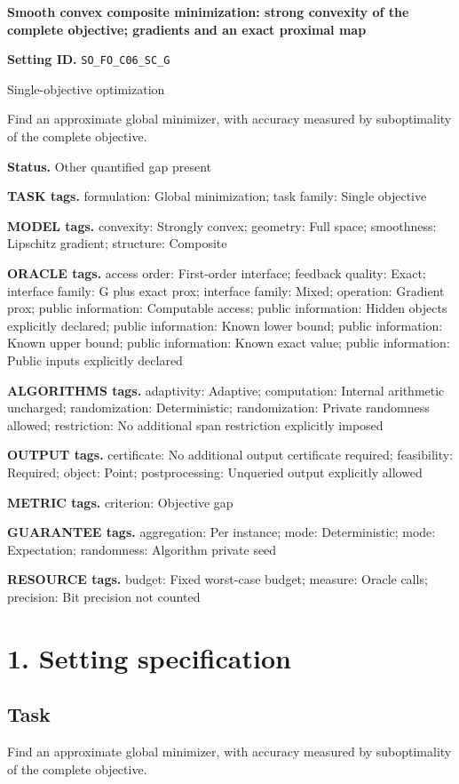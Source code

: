 \documentclass[10pt,a4paper]{article}
\begin{document}
\raggedright

{\LARGE\bfseries\sffamily\color{AtlasNavy} Smooth convex composite minimization: strong convexity of the complete objective; gradients and an exact proximal map\par}\vspace{5pt}
\textbf{Setting ID.} \texttt{SO\_\allowbreak{}FO\_\allowbreak{}C06\_\allowbreak{}SC\_\allowbreak{}G}

Single-objective optimization

Find an approximate global minimizer, with accuracy measured by suboptimality of the complete objective.

\textbf{Status.} Other quantified gap present

\textbf{TASK tags.} formulation: Global minimization; task family: Single objective

\textbf{MODEL tags.} convexity: Strongly convex; geometry: Full space; smoothness: Lipschitz gradient; structure: Composite

\textbf{ORACLE tags.} access order: First-order interface; feedback quality: Exact; interface family: G plus exact prox; interface family: Mixed; operation: Gradient prox; public information: Computable access; public information: Hidden objects explicitly declared; public information: Known lower bound; public information: Known upper bound; public information: Known exact value; public information: Public inputs explicitly declared

\textbf{ALGORITHMS tags.} adaptivity: Adaptive; computation: Internal arithmetic uncharged; randomization: Deterministic; randomization: Private randomness allowed; restriction: No additional span restriction explicitly imposed

\textbf{OUTPUT tags.} certificate: No additional output certificate required; feasibility: Required; object: Point; postprocessing: Unqueried output explicitly allowed

\textbf{METRIC tags.} criterion: Objective gap

\textbf{GUARANTEE tags.} aggregation: Per instance; mode: Deterministic; mode: Expectation; randomness: Algorithm private seed

\textbf{RESOURCE tags.} budget: Fixed worst-case budget; measure: Oracle calls; precision: Bit precision not counted

\section{1. Setting specification}
\subsection{Task}
Find an approximate global minimizer, with accuracy measured by suboptimality of the complete objective.
\end{document}
